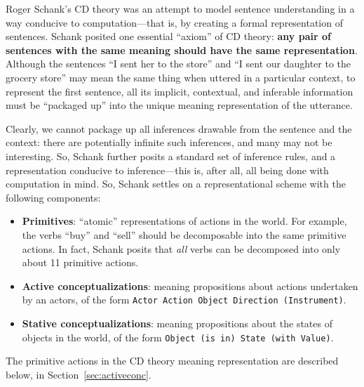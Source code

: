 Roger Schank's CD theory \citep{schank1975concdep} was an attempt to model sentence understanding in a way conducive to computation---that is, by creating a formal representation of sentences. Schank posited one essential ``axiom'' of CD theory: \textbf{any pair of sentences with the same meaning should have the same representation}. Although the sentences ``I sent her to the store'' and ``I sent our daughter to the grocery store'' may mean the same thing when uttered in a particular context, to represent the first sentence, all its implicit, contextual, and inferable information must be ``packaged up'' into the unique meaning representation of the utterance.

Clearly, we cannot package up all inferences drawable from the sentence and the context: there are potentially infinite such inferences, and many may not be interesting. So, Schank further posits a standard set of inference rules, and a representation conducive to inference---this is, after all, all being done with computation in mind. So, Schank settles on a representational scheme with the following components:

\begin{itemize}
    \item \textbf{Primitives}: ``atomic'' representations of actions in the world. For example, the verbs ``buy'' and ``sell'' should be decomposable into the same primitive actions. In fact, Schank posits that \textit{all} verbs can be decomposed into only about 11 primitive actions.
    \item \textbf{Active conceptualizations}: meaning propositions about actions undertaken by an actors, of the form \texttt{Actor Action Object Direction (Instrument)}.
    \item \textbf{Stative conceptualizations}: meaning propositions about the states of objects in the world, of the form \texttt{Object (is in) State (with Value)}.
\end{itemize}

The primitive actions in the CD theory meaning representation are described below, in Section~\ref{sec:activeconc}.

